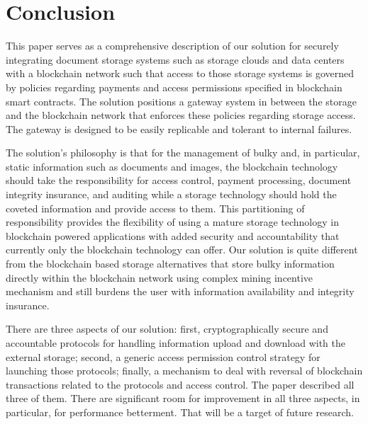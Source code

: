 
\section{Conclusion}
\label{s-con}
This paper serves as a comprehensive description of our solution for securely integrating document storage systems such as storage clouds and data centers with a blockchain network such that access to those storage systems is governed by policies regarding payments and access permissions specified in blockchain smart contracts. The solution positions a gateway system in between the storage and the blockchain network that enforces these policies regarding storage access. The gateway is designed to be easily replicable and tolerant to internal failures.

The solution's philosophy is that for the management of bulky and, in particular, static information such as documents and images, the blockchain technology should take the responsibility for access control, payment processing, document integrity insurance, and auditing while a storage technology should hold the coveted information and provide access to them. This partitioning of responsibility provides the flexibility of using a mature storage technology in blockchain powered applications with added security and accountability that currently only the blockchain technology can offer. Our solution is quite different from the blockchain based storage alternatives that store bulky information directly within the blockchain network using complex mining incentive mechanism and still burdens the user with information availability and integrity insurance.             

There are three aspects of our solution: first, cryptographically secure and accountable protocols for handling information upload and download with the external storage; second, a generic access permission control strategy for launching those protocols; finally, a mechanism to deal with reversal of blockchain transactions related to the protocols and access control. The paper described all three of them. There are significant room for improvement in all three aspects, in particular, for performance betterment. That will be a target of future research.         
 
